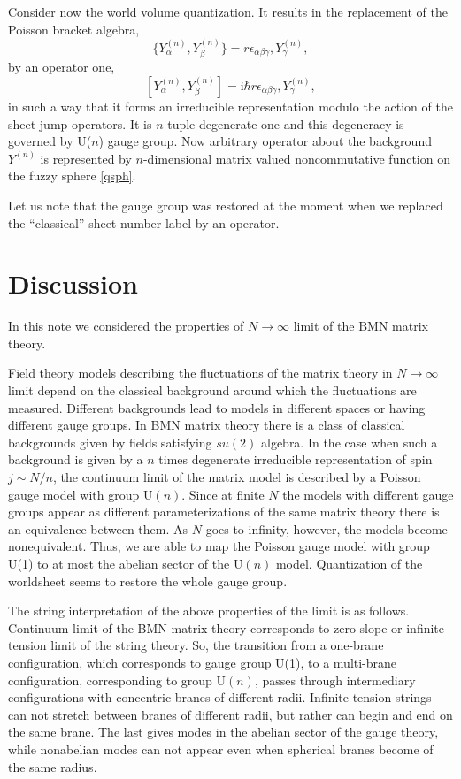 \documentclass[a4paper]{article}
\newcommand{\ii}{\mathrm{i}}
\begin{document}
Consider now the world volume quantization. It results in the
replacement of the Poisson bracket algebra,
\begin{equation}
\{Y_\alpha^{(n)},Y_\beta^{(n)}\}=r
\epsilon_{\alpha\beta\gamma},Y_\gamma^{(n)},
\end{equation}
by an operator one,
\begin{equation}\label{qsph}
[Y_\alpha^{(n)},Y_\beta^{(n)}]=\ii \hbar r
\epsilon_{\alpha\beta\gamma},Y_\gamma^{(n)},
\end{equation}
in such a way that it forms an irreducible representation modulo the
action of the sheet jump operators. It is $n$-tuple degenerate one and
this degeneracy is governed by U($n$) gauge group. Now arbitrary
operator about the background $Y^{(n)}$ is represented by
$n$-dimensional matrix valued noncommutative function on the fuzzy
sphere \eqref{qsph}.

Let us note that the gauge group was restored at the moment when we
replaced the ``classical'' sheet number label by an operator.

\section{Discussion}
In this note we considered the properties of $N\to\infty$ limit of
the BMN matrix theory.

Field theory models describing the fluctuations of the matrix
theory in $N\to\infty$ limit depend on the classical background
around which the fluctuations are measured. Different backgrounds
lead to models in different spaces or having different gauge
groups. In BMN matrix theory there is a class of classical
backgrounds given by fields satisfying $su(2)$ algebra. In the
case when such a background is given by a $n$ times degenerate
irreducible representation of spin $j\sim N/n$, the continuum
limit of the matrix model is described by a Poisson gauge model
with group U$(n)$. Since at finite $N$ the models with different
gauge groups appear as different parameterizations of the same
matrix theory there is an equivalence between them. As $N$ goes to
infinity, however, the models become nonequivalent. Thus, we are
able to map the Poisson gauge model with group U(1) to at most the
abelian sector of the U$(n)$ model. Quantization of the worldsheet
seems to restore the whole gauge group.

The string interpretation of the above properties of the limit is
as follows. Continuum limit of the BMN matrix theory corresponds
to zero slope or infinite tension limit of the string theory. So,
the transition from a one-brane configuration, which corresponds
to gauge group U(1), to a multi-brane configuration, corresponding
to group U$(n)$, passes through intermediary configurations with
concentric branes of different radii. Infinite tension strings can
not stretch between branes of different radii, but rather can
begin and end on the same brane. The last gives modes in the
abelian sector of the gauge theory, while nonabelian modes can not
appear even when spherical branes become of the same radius.
\end{document}
